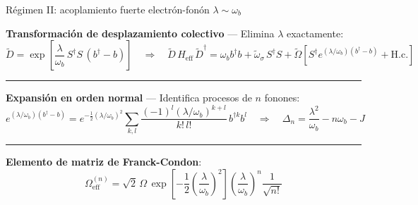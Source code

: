 \documentclass[
11pt,notheorems,hyperref={pdfauthor=whatever}
]{beamer}
\begin{document}
\begin{frame}{Régimen II: acoplamiento fuerte electrón-fonón \texorpdfstring{$\lambda \sim \omega_b$}{}}
	
	\textbf{Transformación de desplazamiento colectivo} — Elimina $\lambda$ exactamente:
	\begin{equation*}
		\widetilde{D} = \exp\!\left[
		\frac{\lambda}{\omega_b}\,S^\dagger S\,(b^\dagger - b)
		\right]
		\quad\Rightarrow\quad
		\widetilde{D}\,H_\mathrm{eff}\,\widetilde{D}^\dagger
		= \omega_b b^\dagger b
		+ \widetilde\omega_\sigma\,S^\dagger S
		+ \widetilde\Omega\!\left[
		S^\dagger e^{(\lambda/\omega_b)(b^\dagger-b)} + \mathrm{H.c.}
		\right]
	\end{equation*}
	
	\vspace{4pt}
	\rule{\textwidth}{0.4pt}
	\vspace{2pt}
	
	\textbf{Expansión en orden normal} — Identifica procesos de $n$ fonones:
	\begin{equation*}
		e^{(\lambda/\omega_b)(b^\dagger-b)}
		= e^{-\frac{1}{2}(\lambda/\omega_b)^2}
		\sum_{k,l}
		\frac{(-1)^l(\lambda/\omega_b)^{k+l}}{k!\,l!}\,b^{\dagger k}b^l
		\quad\Rightarrow\quad
		\boxed{\Delta_n = \frac{\lambda^2}{\omega_b} - n\omega_b - J}
	\end{equation*}
	
	\vspace{4pt}
	\rule{\textwidth}{0.4pt}
	\vspace{2pt}
	
	\textbf{Elemento de matriz de Franck-Condon}:
	\begin{equation*}
		\boxed{
			\Omega_\mathrm{eff}^{(n)}
			= \sqrt{2}\,\Omega\,
			\exp\!\left[-\frac{1}{2}\!\left(\frac{\lambda}{\omega_b}\right)^{\!2}\right]
			\left(\frac{\lambda}{\omega_b}\right)^{\!n}
			\frac{1}{\sqrt{n!}}
		}
	\end{equation*}
	
\end{frame}
\end{document}
